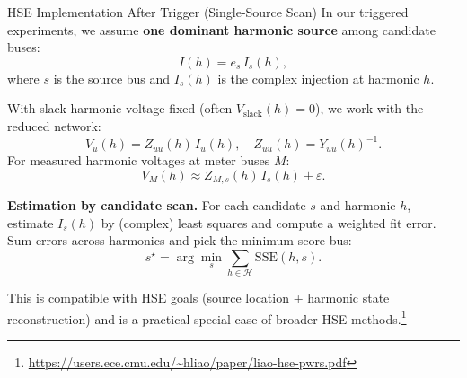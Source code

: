 \documentclass[aspectratio=169]{beamer}
\begin{document}
\begin{frame}{HSE Implementation After Trigger (Single-Source Scan)}
In our triggered experiments, we assume \textbf{one dominant harmonic source} among candidate buses:
\[
I(h)=e_s\,I_s(h),
\]
where $s$ is the source bus and $I_s(h)$ is the complex injection at harmonic $h$.

\vspace{0.4em}
With slack harmonic voltage fixed (often $V_{\text{slack}}(h)=0$), we work with the reduced network:
\[
V_u(h) = Z_{uu}(h)\,I_u(h), \quad Z_{uu}(h)=Y_{uu}(h)^{-1}.
\]
For measured harmonic voltages at meter buses $M$:
\[
V_M(h) \approx Z_{M,s}(h)\,I_s(h) + \varepsilon.
\]

\vspace{0.4em}
\textbf{Estimation by candidate scan.}
For each candidate $s$ and harmonic $h$, estimate $I_s(h)$ by (complex) least squares and compute a weighted fit error.
Sum errors across harmonics and pick the minimum-score bus:
\[
s^\star = \arg\min_s \sum_{h\in\mathcal{H}} \mathrm{SSE}(h,s).
\]

\vspace{0.3em}
\small
This is compatible with HSE goals (source location + harmonic state reconstruction) and is a practical special case of broader HSE methods.\footnote{\url{https://users.ece.cmu.edu/~hliao/paper/liao-hse-pwrs.pdf}}
\end{frame}



\end{document}
